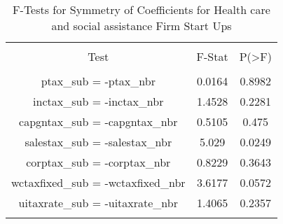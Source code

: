 
\begin{table}[!htbp] \centering 
  \caption{F-Tests for Symmetry of Coefficients for Health care and social assistance Firm Start Ups} 
  \label{62Ftests} 
\begin{tabular}{@{\extracolsep{5pt}} ccc} 
\\[-1.8ex]\hline 
\hline \\[-1.8ex] 
Test & F-Stat & P(\textgreater F) \\ 
\hline \\[-1.8ex] 
ptax\_sub = -ptax\_nbr & 0.0164 & 0.8982 \\ 
inctax\_sub = -inctax\_nbr & 1.4528 & 0.2281 \\ 
capgntax\_sub = -capgntax\_nbr & 0.5105 & 0.475 \\ 
salestax\_sub = -salestax\_nbr & 5.029 & 0.0249 \\ 
corptax\_sub = -corptax\_nbr & 0.8229 & 0.3643 \\ 
wctaxfixed\_sub = -wctaxfixed\_nbr & 3.6177 & 0.0572 \\ 
uitaxrate\_sub = -uitaxrate\_nbr & 1.4065 & 0.2357 \\ 
\hline \\[-1.8ex] 
\end{tabular} 
\end{table} 
